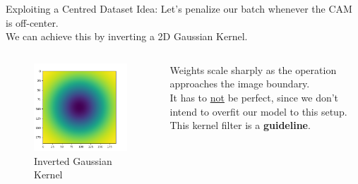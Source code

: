 \documentclass{beamer}
\begin{document}
\begin{frame}{Exploiting a Centred Dataset}
	Idea: Let's penalize our batch whenever the CAM is off-center. \pause \newline \\

	We can achieve this by inverting a 2D Gaussian Kernel.
	\begin{columns}
		\begin{column}{.4\textwidth}
			\begin{figure}
				\includegraphics[width=\textwidth]{img/kernel}
				\caption*{\footnotesize Inverted Gaussian Kernel}
			\end{figure} \pause
		\end{column}
		\begin{column}{.6\textwidth}
			Weights scale sharply as the operation approaches the image boundary. \pause \newline \\

			It has to \underline{not} be perfect, since we don't intend to overfit our model to this setup. This kernel filter is a \textbf{guideline}.
		\end{column}
	\end{columns}
\end{frame}
\end{document}
